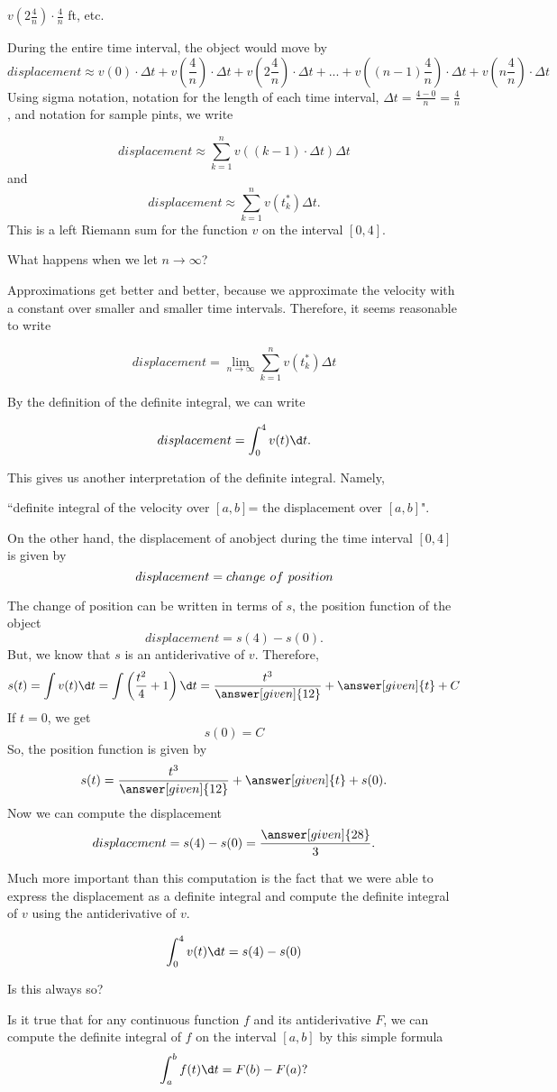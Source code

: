 \documentclass{ximera}
\begin{document}
\begin{example}
\begin{explanation}
 $v\left(2\frac{4}{n}\right)\cdot\frac{4}{n}$ ft, etc. 
 
 During the entire time interval, the object would move by
\[
   displacement \approx v(0)\cdot\Delta t+v\left(\frac{4}{n}\right)\cdot\Delta t+v\left(2\frac{4}{n}\right)\cdot\Delta t+...+v\left((n-1)\frac{4}{n}\right)\cdot\Delta t+v\left(n\frac{4}{n}\right)\cdot\Delta t
\]
Using sigma notation, notation for  the length of each time interval, $\Delta t=\frac{4-0}{n}=\frac{4}{n}$, and notation for sample pints, we write 

  \[
   displacement\approx \sum_{k=1}^nv((k-1)\cdot\Delta t)\Delta t
\]
and
\[
   displacement\approx \sum_{k=1}^nv(t_{k}^*)\Delta t.
  \]
  This is a left Riemann sum for the function $v$ on the interval $[0,4]$.
  
  
What happens when we let $n\to\infty$?

Approximations get better and better, because we approximate the velocity with a constant over smaller and smaller time intervals.
Therefore, it seems reasonable to  write

  \[
   displacement=\lim_{n\to\infty}\sum_{k=1}^nv(t_k^*)\Delta t
\]

By  the definition of the definite integral, we can write


  \[
   displacement=\int_{0}^{4}v(t)\d t.
\]

This gives us another interpretation of the definite integral. Namely,



``definite integral of the velocity over $[a,b]$= the displacement over $[a,b]$".



  On the other hand, the displacement of anobject during the time interval $[0,4]$ is given by
  \[
   displacement=change\hspace{0.05in} of\hspace{0.05in} position
\]
  
  The change of position can be written in terms of $s$, the position function of the object
  \[
   displacement=s(4)-s(0).
\]
But, we know that $s$ is an antiderivative of $v$. Therefore,
 \[
  s(t)=\int v(t)\d t=\int\left(\frac{t^2}{4}+1\right)\d t=\frac{t^3}{\answer[given]{12}}+\answer[given]{t}+C
\]
If $t=0$, we get
 \[
  s(0)=C
\]
So, the position function is given by
\[
  s(t)=\frac{t^3}{\answer[given]{12}}+\answer[given]{t}+s(0).
\]
Now we can compute the displacement
 \[
   displacement=s(4)-s(0)=\frac{\answer[given]{28}}{3}.
\]
  \end{explanation}
  
Much more important than this computation is the fact that we were able to express the displacement as a definite integral and  compute the definite integral  of $v$ using the antiderivative of $v$.

 \[
   \int_{0}^{4}v(t)\d t=s(4)-s(0)
\]

Is this always so?

Is it true that for any continuous function $f$ and its antiderivative $F$, we can compute the definite integral of $f$ on the interval $[a,b]$ by this simple formula
\[
   \int_{a}^{b}f(t)\d t=F(b)-F(a)?
\]

\end{example}
\end{document}
